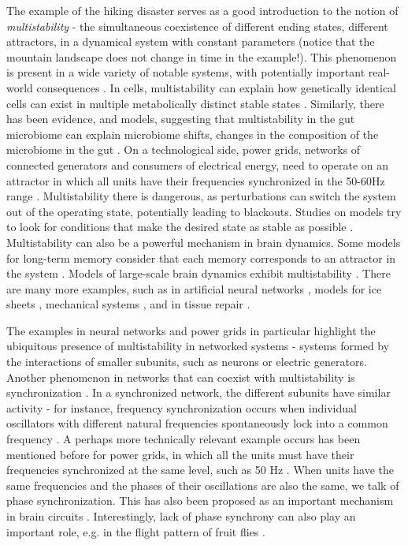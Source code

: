 The example of the hiking disaster serves as a good introduction to the notion of \textit{multistability} - the simultaneous coexistence of different ending states, different attractors, in a dynamical system with constant parameters (notice that the mountain landscape does not change in time in the example!). This phenomenon is present in a wide variety of notable systems, with potentially important real-world consequences \cite{feudel2008complex, pisarchik2022multistability, pisarchik2014control}. In cells, multistability can explain how genetically identical cells can exist in multiple metabolically distinct stable states \cite{zhu2022synthetic, regan2012dynamical}. Similarly, there has been evidence, and models, suggesting that multistability in the gut microbiome can explain microbiome shifts, changes in the composition of the microbiome in the gut \cite{khazaei2022metabolic}. On a technological side, power grids, networks of connected generators and consumers of electrical energy, need to operate on an attractor in which all units have their frequencies synchronized in the 50-60Hz range \cite{hellmann2020network}. Multistability there is dangerous, as perturbations can switch the system out of the operating state, potentially leading to blackouts. Studies on models try to look for conditions that make the desired state as stable as possible \cite{hellmann2020network, halekotte2021transient}. Multistability can also be a powerful mechanism in brain dynamics. Some models for long-term memory consider that each memory corresponds to an attractor in the system \cite{wilson1972excitatory, foss1996multistability}. Models of large-scale brain dynamics exhibit multistability \cite{golos2015multistability}. There are many more examples, such as in artificial neural networks \cite{flynn2024exploring}, models for ice sheets \cite{robinson2012multistability}, mechanical systems \cite{feudel1998dynamical}, and in tissue repair \cite{adler2020principles}.

The examples in neural networks and power grids in particular highlight the ubiquitous presence of multistability in networked systems - systems formed by the interactions of smaller subunits, such as neurons or electric generators.  Another phenomenon in networks that can coexist with multistability is synchronization \cite{pikovsky2001synchronization, boccaletti2018synchronization}. In a synchronized network, the different subunits have similar activity - for instance, frequency synchronization occurs when individual oscillators with different natural frequencies spontaneously lock into a common frequency \cite{strogatz2000from}. A perhaps more technically relevant example occurs has been mentioned before for power grids, in which all the units must have their frequencies synchronized at the same level, such as 50 Hz \cite{hellmann2020network}. When units have the same frequencies and the phases of their oscillations are also the same, we talk of phase synchronization. This has also been proposed as an important mechanism in brain circuits \cite{singer1999neuronal, fries2015rhythms, womelsdorf2007the}. Interestingly, lack of phase synchrony can also play an important role, e.g. in the flight pattern of fruit flies \cite{hurkey2023gap}. 

